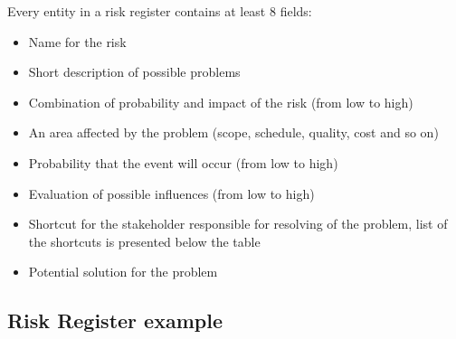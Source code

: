 \documentclass[english]{article}
\begin{document}
Every entity in a risk register contains at least 8 fields:
\begin{itemize}
\item Name for the risk
\item Short description of possible problems
\item Combination of probability and impact of the risk (from low to high)
\item An area affected by the problem (scope, schedule, quality, cost and so on)
\item Probability that the event will occur (from low to high)
\item Evaluation of possible influences (from low to high)
\item Shortcut for the stakeholder responsible for resolving of the problem, list of the shortcuts is presented below the table
\item Potential solution for the problem
\end{itemize}

\subsection{Risk Register example}
\end{document}
